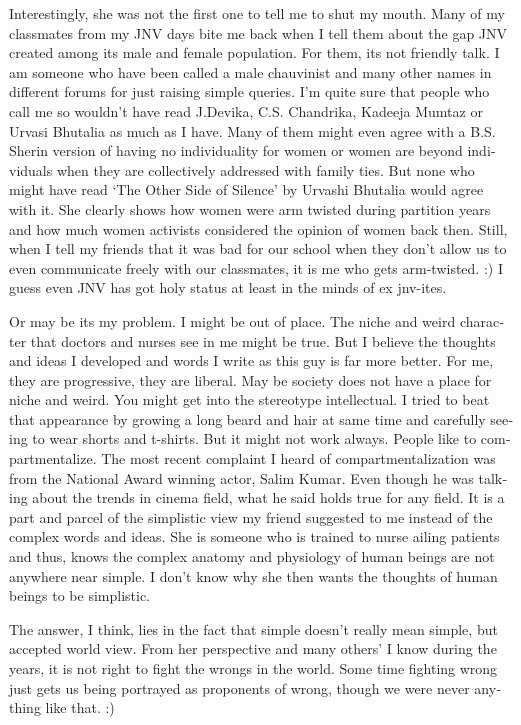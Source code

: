 \begin{english}
Interestingly, she was not the first one to tell me to shut my mouth. Many of my classmates from my JNV days bite me back when I tell them about the gap JNV created among its male and female population. For them, its not friendly talk. I am someone who have been called a male chauvinist and many other names in different forums for just raising simple queries. I'm quite sure that people who call me so wouldn't have read J.Devika, C.S. Chandrika, Kadeeja Mumtaz or Urvasi Bhutalia as much as I have. Many of them might even agree with a B.S. Sherin version of having no individuality for women or women are beyond individuals when they are collectively addressed with family ties. But none who might have read `The Other Side of Silence' by Urvashi Bhutalia would agree with it. She clearly shows how women were arm twisted during partition years and how much women activists considered the opinion of women back then. Still, when I tell my friends that it was bad for our school when they don't allow us to even communicate freely with our classmates, it is me who gets arm-twisted. :) I guess even JNV has got holy status at least in the minds of ex jnv-ites. 

Or may be its my problem. I might be out of place. The niche and weird character that doctors and nurses see in me might be true. But I believe the thoughts and ideas I developed and words I write as this guy is far more better. For me, they are progressive, they are liberal. May be society does not have a place for niche and weird. You might get into the stereotype intellectual. I tried to beat that appearance by growing a long beard and hair at same time and carefully seeing to wear shorts and t-shirts. But it might not work always. People like to compartmentalize. The most recent complaint I heard of compartmentalization was from the National Award winning actor, Salim Kumar. Even though he was talking about the trends in cinema field, what he said holds true for any field. It is a part and parcel of the simplistic view my friend suggested to me instead of the complex words and ideas. She is someone who is trained to nurse ailing patients and thus, knows the complex anatomy and physiology of human beings are not anywhere near simple. I don't know why she then wants the thoughts of human beings to be simplistic. 

The answer, I think, lies in the fact that simple doesn't really mean simple, but accepted world view. From her perspective and many others' I know during the years, it is not right to fight the wrongs in the world. Some time fighting wrong just gets us being portrayed as proponents of wrong, though we were never anything like that. :)
\end{english}
\newpage
